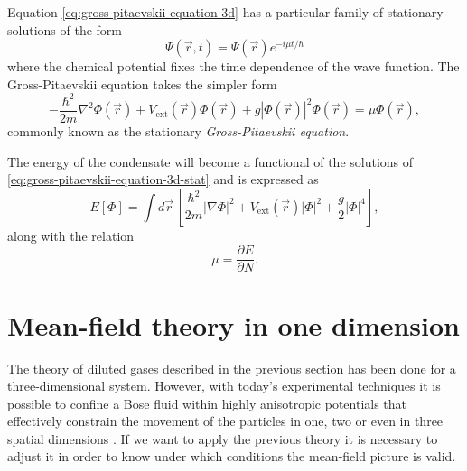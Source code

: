 Equation \eqref{eq:gross-pitaevskii-equation-3d} has a particular family of
stationary solutions of the form
%
\begin{equation}
  \Psi(\vec r, t) = \Psi(\vec r) e^{-i\mu t /\hbar}
\end{equation}
%
where the chemical potential fixes the time dependence of the wave function. The
Gross-Pitaevskii equation takes the simpler form
%
\begin{equation}
  \label{eq:gross-pitaevskii-equation-3d-stat}
  -\frac{\hbar^2}{2m} \nabla^2 \Phi(\vec r) +
  V_\mathrm{ext}(\vec r) \Phi(\vec r) +
  g \left| \Phi(\vec r) \right|^2 \Phi(\vec r) = \mu \Phi(\vec r),
\end{equation}
%
commonly known as the stationary \textit{Gross-Pitaevskii equation}.

The energy of the condensate will become a functional of the solutions of
\eqref{eq:gross-pitaevskii-equation-3d-stat} and is expressed as
%
\begin{equation}
  \label{eq:gross-pitaevskii-energy}
  E[\Phi] = \int d\vec r \, \left[
    \frac{\hbar^2}{2m} |\nabla \Phi|^2 + V_\mathrm{ext}(\vec r) |\Phi|^2 +
    \frac{g}{2} |\Phi|^4
    \right],
\end{equation}
%
along with the relation
%
\begin{equation}
  \label{eq:gross-pitaevskii-energy-chemical-potential}
  \mu = \frac{\partial E}{\partial N}.
\end{equation}



\section{Mean-field theory in one dimension}
\label{sec:mean-field-theory-in-one-dimension}

The theory of diluted gases described in the previous section has been done for
a three-dimensional system. However, with today's experimental techniques it is
possible to confine a Bose fluid within highly anisotropic potentials that
effectively constrain the movement of the particles in one, two or even in three
spatial dimensions \cite{bib:a-gorlitz-phys-rev-lett.87.130402,
  bib:paredes-bloch-et-al-nature.419.2014}. If we want to apply the previous
theory it is necessary to adjust it in order to know under which conditions the
mean-field picture is valid.

